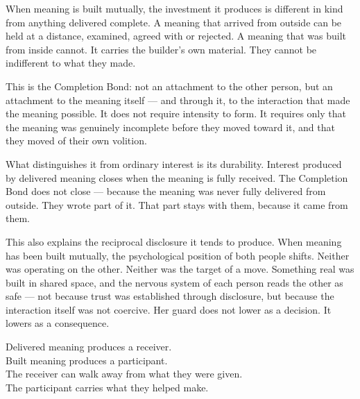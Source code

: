 When meaning is built mutually, the investment it produces is different 
in kind from anything delivered complete. A meaning that arrived from 
outside can be held at a distance, examined, agreed with or rejected. 
A meaning that was built from inside cannot. It carries the builder's 
own material. They cannot be indifferent to what they made.

This is the Completion Bond: not an attachment to the other person, 
but an attachment to the meaning itself --- and through it, to the 
interaction that made the meaning possible. It does not require 
intensity to form. It requires only that the meaning was genuinely 
incomplete before they moved toward it, and that they moved of their own 
volition.

What distinguishes it from ordinary interest is its durability. 
Interest produced by delivered meaning closes when the meaning is 
fully received. The Completion Bond does not close --- because the 
meaning was never fully delivered from outside. They wrote part of it. 
That part stays with them, because it came from them.

This also explains the reciprocal disclosure it tends to produce. 
When meaning has been built mutually, the psychological position 
of both people shifts. Neither was operating on the other. Neither 
was the target of a move. Something real was built in shared space, 
and the nervous system of each person reads the other as safe --- 
not because trust was established through disclosure, but because 
the interaction itself was not coercive. Her guard does not lower 
as a decision. It lowers as a consequence.

\begin{calloutbox}
Delivered meaning produces a receiver.\\
Built meaning produces a participant.\\[0.4em]
The receiver can walk away from what they were given.\\
The participant carries what they helped make.
\end{calloutbox}